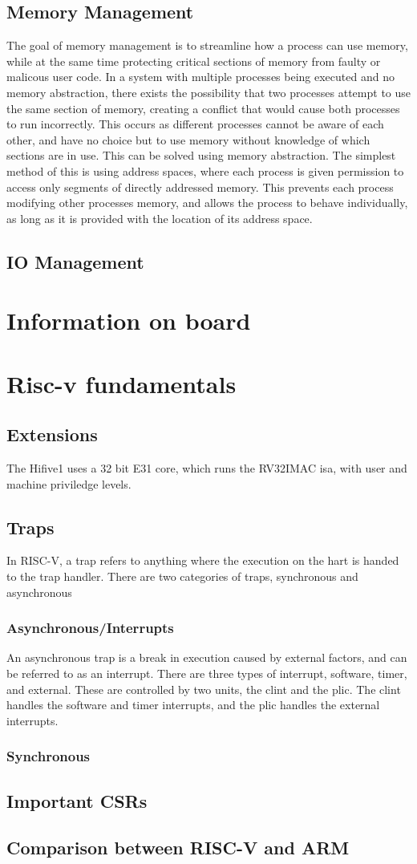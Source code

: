 \subsection{Memory Management}
The goal of memory management is to streamline how a process can use memory, while at the same time protecting critical sections of memory from faulty or malicous user code. In a system with multiple processes being executed and no memory abstraction, there exists the possibility that two processes attempt to use the same section of memory, creating a conflict that would cause both processes to run incorrectly. This occurs as different processes cannot be aware of each other, and have no choice but to use memory without knowledge of which sections are in use. This can be solved using memory abstraction. The simplest method of this is using address spaces, where each process is given permission to access only segments of directly addressed memory. This prevents each process modifying other processes memory, and allows the process to behave individually, as long as it is provided with the location of its address space.\cite{modern_operating}
\subsection{IO Management}
\section{Information on board}
\section{Risc-v fundamentals}
\subsection{Extensions}
The Hifive1 uses a 32 bit E31 core, which runs the RV32IMAC \ac{isa}, with user and machine priviledge levels. 
\subsection{Traps}
In RISC-V, a trap refers to anything where the execution on the hart is handed to the trap handler. There are two categories of traps, synchronous and asynchronous
\subsubsection{Asynchronous/Interrupts}
An asynchronous trap is a break in execution caused by external factors, and can be referred to as an interrupt. There are three types of interrupt, software, timer, and external. These are controlled by two units, the \ac{clint} and the \ac{plic}. The \ac{clint} handles the software and timer interrupts, and the \ac{plic} handles the external interrupts.
\subsubsection{Synchronous}
\subsection{Important CSRs}
\subsection{Comparison between RISC-V and ARM}